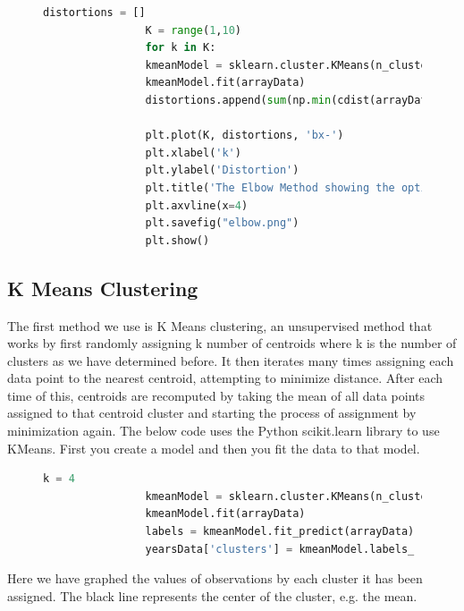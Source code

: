 \documentclass[letter, 11pt]{article} %
\begin{document}
		\begin{figure}[H]
			\centering
			\begin{lstlisting}[language=python]
				distortions = []
				K = range(1,10)
				for k in K:
				kmeanModel = sklearn.cluster.KMeans(n_clusters=k).fit(arrayData)
				kmeanModel.fit(arrayData)
				distortions.append(sum(np.min(cdist(arrayData, kmeanModel.cluster_centers_, 'euclidean'), axis=1)) / arrayData.shape[0])
				
				plt.plot(K, distortions, 'bx-')
				plt.xlabel('k')
				plt.ylabel('Distortion')
				plt.title('The Elbow Method showing the optimal k')
				plt.axvline(x=4)
				plt.savefig("elbow.png")
				plt.show()
			\end{lstlisting}
		\end{figure}	

		\pagebreak

	
	\subsection{K Means Clustering}
	
		The first method we use is K Means clustering, an unsupervised method that works by first randomly assigning k number of centroids where k is the number of clusters as we have determined before. It then iterates many times assigning each data point to the nearest centroid, attempting to minimize distance. After each time of this, centroids are recomputed by taking the mean of all data points assigned to that centroid cluster and starting the process of assignment by minimization again. The below code uses the Python scikit.learn library to use KMeans. First you create a model and then you fit the data to that model.
		
		\begin{figure}[H]
			\centering
			\begin{lstlisting}[language=python]
				k = 4
				kmeanModel = sklearn.cluster.KMeans(n_clusters=k).fit(arrayData)
				kmeanModel.fit(arrayData)
				labels = kmeanModel.fit_predict(arrayData)
				yearsData['clusters'] = kmeanModel.labels_
			\end{lstlisting}			
		\end{figure}
		
		\pagebreak
	
		\noindent Here we have graphed the values of observations by each cluster it has been assigned. The black line represents the center of the cluster, e.g. the mean. 
	
\end{document}
